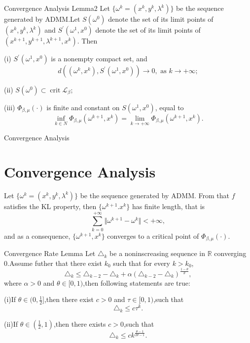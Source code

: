 \documentclass[10pt,cjk]{beamer}
\begin{document}
	\begin{frame}{Convergence Analysis Lemma2}
		Let $\{\omega^{k}=\left(x^{k},y^{k},\lambda^{k}\right)\}$ be the sequence generated by ADMM.Let $S\left(\omega^0\right)$ denote the set of its limit points of ${\left(x^{k},y^{k},\lambda^{k}\right)}$ and $S^{'}\left(\omega^{1},x^{0}\right)$ denote the set of its limit points of  ${\left(x^{k+1},y^{k+1},\lambda^{k+1},x^{k}\right)}.$ Then
		
		(i) $S^{'}\left(\omega^{1},x^{0}\right)$ is a nonempty compact set, and
		$$
		d\left(\left(\omega^k,x^k\right), S^{'}\left(\omega^{1},x^{0}\right)\right) \rightarrow 0, \text { as } k \rightarrow+\infty ;
		$$
		
		(ii) $S\left(\omega^0\right) \subset \operatorname{crit} \mathcal{L}_\beta$;
		
		(iii) $\Phi_{\beta,\mu}\left(\cdot\right)$ is finite and constant on $S\left(\omega^1,x^0\right)$, equal to $$\inf\limits_{k \in N} \Phi_{\beta,\mu}\left(\omega^{k+1},x^{k}\right)=\lim\limits_{k \rightarrow+\infty} \Phi_{\beta,\mu}\left(\omega^{k+1},x^{k}\right).$$
	\end{frame}
	
	
	\begin{frame}{Convergence Analysis}
		\section{Convergence Analysis}
		Let $\{\omega^{k}=\left(x^{k},y^{k},\lambda^{k}\right)\}$ be the sequence generated by ADMM. From that $f$ satisfies the KL property, then $\{\omega^{k+1}.x^{k}\}$ has finite length, that is
		$$
		\sum_{k=0}^{+\infty}\Vert \omega^{k+1}-\omega^k\Vert<+\infty,
		$$
		and as a consequence, $\{\omega^{k+1},x^{k}\}$ converges to a critical point of $\Phi_{\beta,\mu}\left(\cdot\right)$.
	\end{frame}
	
	
	\begin{frame}{Convergence Rate Lemma}
		Let $\triangle_{k}$ be a noninscreasing sequence in $\mathbb{R}$ converging 0.Assume futher that there exist $k_{0}$ such that for every $k>k_{0}$,
		$$\triangle_{k}\le\triangle_{k-2}-\triangle_{k}+\alpha\left(\triangle_{k-2}-\triangle_{k}\right)^{\frac{1-\theta}{\theta}},$$
		where $\alpha>0$ and $\theta\in[0,1)$,then following statements are true:
		
		(i)If $\theta\in(0,\frac{1}{2}]$,then there exist $c>0$ and $\tau\in[0,1)$,such that
		$$\triangle_{k}\le c\tau^{k}.$$
		
		(ii)If $\theta\in\left(\frac{1}{2},1\right)$,then there exists $c>0$,such that
		$$\triangle_{k}\le ck^{\frac{\theta-1}{2\theta-1}}.$$
	\end{frame}
	
\end{document}
